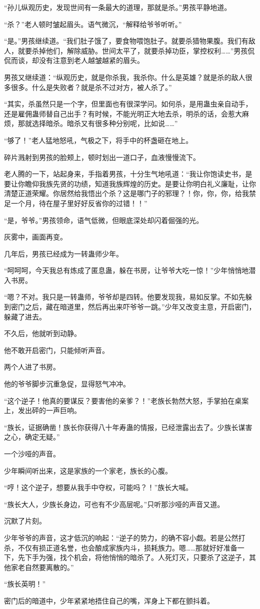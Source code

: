 \begin{this_body}
“孙儿纵观历史，发现世间有一条最大的道理，那就是杀。”男孩平静地道。

“杀？”老人顿时皱起眉头。语气微沉，“解释给爷爷听听。”

“是。”男孩继续道。“我们肚子饿了，要食物喂饱肚子。就要杀猎物果腹。我们有敌人，就要杀掉他们，解除威胁。世间太平了，就要杀掉功臣，掌控权利……”男孩侃侃而谈，却没有注意到老人越皱越紧的眉头。

男孩又继续道：“纵观历史，就是你杀我，我杀你。什么是英雄？就是杀的敌人很多很多。什么是失败者？就是杀不过对方，被人杀了。”

“其实，杀虽然只是一个字，但里面也有很深学问。如何杀，是用蛊虫亲自动手，还是雇佣蛊师替自己出手？有时候，不能光明正大地去杀，明杀的话，会惹大麻烦，那就选择暗杀。暗杀又有很多种分别呢，比如说……”

“够了！”老人猛地怒吼，气极之下，将手中的杯盏砸在地上。

碎片溅射到男孩的脸颊上，顿时划出一道口子，血液慢慢流下。

老人腾的一下，站起身来，手指着男孩，十分生气地吼道：“我让你饱读史书，是要让你瞻仰我族先贤的功绩，知道我族辉煌的历史。是要让你明白礼义廉耻，让你清楚正道荣耀。你居然给我悟出个杀？这是哪门子的邪理？！你，你，你，给我禁足一个月，待在屋子里好好反省你的过错！！”

“是，爷爷。”男孩领命，语气低微，但眼底深处却闪着倔强的光。

灰雾中，画面再变。

几年后，男孩已经成为一转蛊师少年。

“呵呵呵，今天我总有炼成了匿息蛊，躲在书房，让爷爷大吃一惊！”少年悄悄地潜入书房。

“嗯？不对。我只是一转蛊师，爷爷却是四转。他要发现我，易如反掌。不如先躲到密门之后，藏在暗道里，然后再出来吓爷爷一跳。”少年又改变主意，开启密门，躲藏了进去。

不久后，他就听到动静。

他不敢开启密门，只能倾听声音。

两个人进了书房。

他的爷爷脚步沉重急促，显得怒气冲冲。

“这个逆子！他真的要谋反？要害他的亲爹？！”老族长勃然大怒，手掌拍在桌案上，发出砰的一声巨响。

“族长，证据确凿！族长你获得八十年寿蛊的情报，已经泄露出去了。少族长谋害之心，确定无疑。”

一个沙哑的声音。

少年瞬间听出来，这是家族的一个家老，族长的心腹。

“哼！这个逆子，想要从我手中夺权，可能吗？！”族长大喊。

“族长大人，少族长身边，可也有不少高层呢。”只听那沙哑的声音又道。

沉默了片刻。

少年爷爷的声音，这才低沉的响起：“逆子的势力，的确不容小觑。若是公然打杀，不仅有损正道名誉，也会酿成家族内斗，损耗族力。嗯……那就好好准备一下，先下手为强，找个机会，将他悄悄的暗杀了。人死灯灭，只要杀了这逆子，其他家老自然要离散的。”

“族长英明！”

密门后的暗道中，少年紧紧地捂住自己的嘴，浑身上下都在颤抖着。

\end{this_body}

